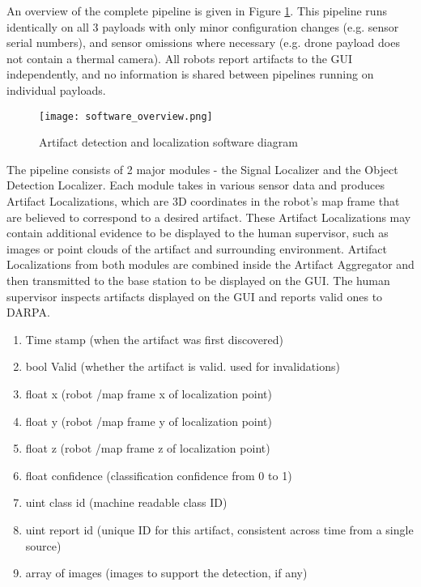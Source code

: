 An overview of the complete pipeline is given in Figure \ref{software_overview}. This pipeline runs identically on all 3 payloads with only minor configuration changes (e.g. sensor serial numbers), and sensor omissions where necessary (e.g. drone payload does not contain a thermal camera). All robots report artifacts to the GUI independently, and no information is shared between pipelines running on individual payloads.

\begin{figure}	
	\centering
	\texttt{[image: software\_overview.png]}
	\caption{Artifact detection and localization software diagram}
	\label{software_overview}
\end{figure}

The pipeline consists of 2 major modules - the Signal Localizer and the Object Detection Localizer. Each module takes in various sensor data and produces Artifact Localizations, which are 3D coordinates in the robot's map frame that are believed to correspond to a desired artifact. These Artifact Localizations may contain additional evidence to be displayed to the human supervisor, such as images or point clouds of the artifact and surrounding environment. Artifact Localizations from both modules are combined inside the Artifact Aggregator and then transmitted to the base station to be displayed on the GUI. The human supervisor inspects artifacts displayed on the GUI and reports valid ones to DARPA.

\begin{enumerate}
	\item Time stamp (when the artifact was first discovered)
	\item bool Valid (whether the artifact is valid. used for invalidations)
	\item float x (robot /map frame x of localization point)
	\item float y (robot /map frame y of localization point)
	\item float z (robot /map frame z of localization point)
	\item float confidence (classification confidence from 0 to 1)
	\item uint class id (machine readable class ID)
	\item uint report id (unique ID for this artifact, consistent across time from a single source)
	\item array of images (images to support the detection, if any)	
\end{enumerate}

